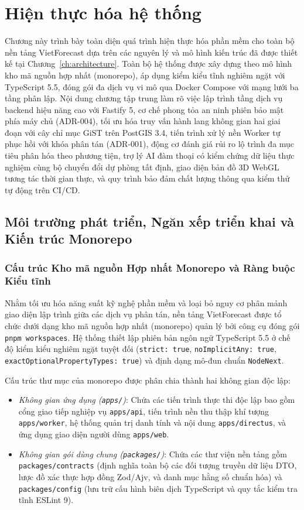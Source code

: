 \chapter{Hiện thực hóa hệ thống}
\label{ch:implementation}

Chương này trình bày toàn diện quá trình hiện thực hóa phần mềm cho toàn bộ nền tảng VietForecast dựa trên các nguyên lý và mô hình kiến trúc đã được thiết kế tại Chương~\ref{ch:architecture}. Toàn bộ hệ thống được xây dựng theo mô hình kho mã nguồn hợp nhất (monorepo), áp dụng kiểm kiểu tĩnh nghiêm ngặt với TypeScript 5.5, đóng gói đa dịch vụ vi mô qua Docker Compose với mạng lưới ba tầng phân lập. Nội dung chương tập trung làm rõ việc lập trình tầng dịch vụ backend hiệu năng cao với Fastify 5, cơ chế phong tỏa an ninh phiên bảo mật phía máy chủ (ADR-004), tối ưu hóa truy vấn hành lang không gian hai giai đoạn với cây chỉ mục GiST trên PostGIS 3.4, tiến trình xử lý nền Worker tự phục hồi với khóa phân tán (ADR-001), động cơ đánh giá rủi ro lộ trình đa mục tiêu phân hóa theo phương tiện, trợ lý AI đàm thoại có kiểm chứng dữ liệu thực nghiệm cùng bộ chuyển đổi dự phòng tất định, giao diện bản đồ 3D WebGL tương tác thời gian thực, và quy trình bảo đảm chất lượng thông qua kiểm thử tự động trên CI/CD.

\section{Môi trường phát triển, Ngăn xếp triển khai và Kiến trúc Monorepo}
\label{sec:monorepo_deployment_stack}

\subsection{Cấu trúc Kho mã nguồn Hợp nhất Monorepo và Ràng buộc Kiểu tĩnh}
Nhằm tối ưu hóa năng suất kỹ nghệ phần mềm và loại bỏ nguy cơ phân mảnh giao diện lập trình giữa các dịch vụ phân tán, nền tảng VietForecast được tổ chức dưới dạng kho mã nguồn hợp nhất (monorepo) quản lý bởi công cụ đóng gói \texttt{pnpm workspaces}. Hệ thống thiết lập phiên bản ngôn ngữ TypeScript 5.5 ở chế độ kiểm kiểu nghiêm ngặt tuyệt đối (\texttt{strict: true}, \texttt{noImplicitAny: true}, \texttt{exactOptionalPropertyTypes: true}) và định dạng mô-đun chuẩn \texttt{NodeNext}.

Cấu trúc thư mục của monorepo được phân chia thành hai không gian độc lập:
\begin{itemize}
    \item[-] \textit{Không gian ứng dụng (\texttt{apps/})}: Chứa các tiến trình thực thi độc lập bao gồm cổng giao tiếp nghiệp vụ \texttt{apps/api}, tiến trình nền thu thập khí tượng \texttt{apps/worker}, hệ thống quản trị danh tính và nội dung \texttt{apps/directus}, và ứng dụng giao diện người dùng \texttt{apps/web}.
    \item[-] \textit{Không gian gói dùng chung (\texttt{packages/})}: Chứa các thư viện nền tảng gồm \texttt{packages/contracts} (định nghĩa toàn bộ các đối tượng truyền dữ liệu DTO, lược đồ xác thực hợp đồng Zod/Ajv, và danh mục hằng số chuẩn hóa) và \texttt{packages/config} (lưu trữ cấu hình biên dịch TypeScript và quy tắc kiểm tra tĩnh ESLint 9).
\end{itemize}

